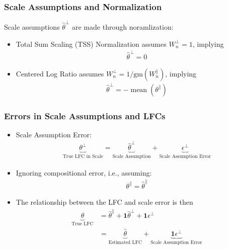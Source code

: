 \documentclass[11pt]{beamer}
\DeclareMathOperator*{\mean}{mean}
\begin{document}
\begin{frame}
  \frametitle{Scale Assumptions and Normalization}

  Scale assumptions \(\hat{\theta}^\perp\) are made through noramlization:
  \begin{itemize}
    \item Total Sum Scaling (TSS) Normalization assumes \(W^\perp_n=1\), implying
      \begin{align*}
        \hat{\theta}^\perp = 0
      \end{align*}
    \item Centered Log Ratio assumes \(W^\perp_n=1/\text{gm}(W^\parallel_n)\), implying
      \begin{align*}
        \hat{\theta}^\perp = -\mean(\theta^\parallel)
      \end{align*}
  \end{itemize} 
\end{frame}

\begin{frame}
  \frametitle{Errors in Scale Assumptions and LFCs}

  \begin{itemize}
  \item Scale Assumption Error:  
  \begin{align*}
    \underbrace{\theta^\perp}_{\text{True LFC in Scale}} = \underbrace{\hat{\theta}^\perp}_{\text{Scale Assumption}} + \underbrace{\epsilon^\perp}_{\text{Scale Assumption Error}}
  \end{align*}

  \pause
  
  \item Ignoring compositional error, i.e., assuming:
    \begin{align*}
      \theta^\parallel = \hat{\theta}^\parallel
    \end{align*}

    \pause

  \item The relationship between the LFC and scale error is then
    \begin{align*}
      \underbrace{\theta}_{\text{True LFC}} &= \hat{\theta}^\parallel + \pmb{1}\hat{\theta}^\perp + \pmb{1}\epsilon^\perp \\
                                        &= \underbrace{\hat{\theta}}_{\text{Estimated LFC}} + \underbrace{\pmb{1}\epsilon^\perp}_{\text{Scale Assumption Error}}
    \end{align*}
  \end{itemize}
\end{frame}
\end{document}

